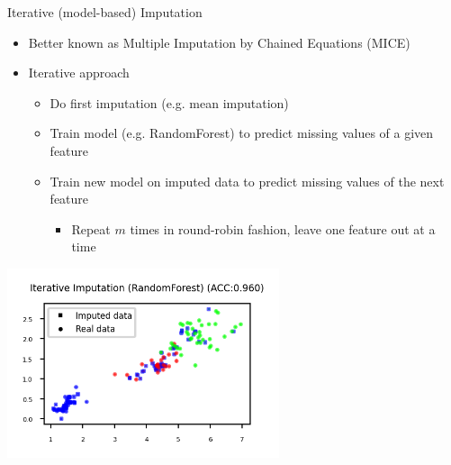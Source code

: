 \begin{frame}[allowframebreaks]{Iterative (model-based) Imputation}

\begin{itemize}
    \item Better known as Multiple Imputation by Chained Equations (MICE)
    \item Iterative approach
    \begin{itemize}
        \item Do first imputation (e.g. mean imputation)
        \item Train model (e.g. RandomForest) to predict missing values of a given feature
        \item Train new model on imputed data to predict missing values of the next feature
        \begin{itemize}
            \item Repeat $m$ times in round-robin fashion, leave one feature out at a time
        \end{itemize}
    \end{itemize}
\end{itemize}

\vspace{1em}

\begin{center}
    \includegraphics[width=0.6\textwidth]{images/pre-processing/iterative-imputation.png}
\end{center}

\end{frame}


